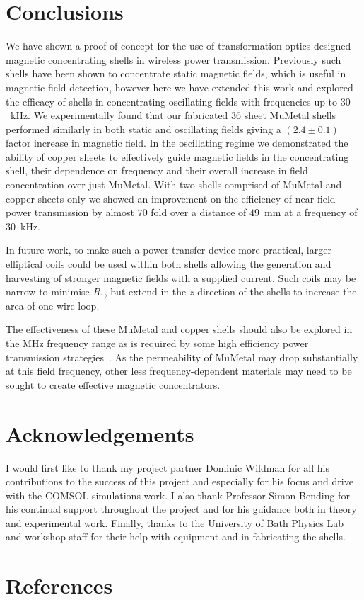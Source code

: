 \documentclass[11pt]{iopart}
\begin{document}
\section{Conclusions}

We have shown a proof of concept for the use of transformation-optics
designed magnetic concentrating shells in wireless power
transmission. Previously such shells have been shown to concentrate
static magnetic fields, which is useful in magnetic field detection, however here
we have extended this work and explored the efficacy of shells in
concentrating oscillating fields with frequencies up to $30$~kHz. We experimentally
found that our fabricated $36$ sheet MuMetal shells performed
similarly in both static and oscillating fields giving a $(2.4\pm0.1)$
factor increase in magnetic field. In the oscillating regime we
demonstrated the ability of copper sheets to effectively guide magnetic
fields in the concentrating shell, their dependence on frequency and their
overall increase in field concentration over just MuMetal. With two
shells comprised of MuMetal and copper sheets only we showed an
improvement on the efficiency of near-field power transmission by
almost $70$ fold over a distance of $49$~mm at a frequency of
$30$~kHz.

In future work, to make such a power transfer device more practical,
larger elliptical coils could be used within both shells allowing the
generation and harvesting of stronger magnetic fields with a supplied
current. Such coils may be narrow to minimise $R_1$, but extend in the
$z$-direction of the shells to increase the area of one wire
loop.

The effectiveness of these MuMetal and copper shells should also be
explored in the MHz frequency range as is required by some high
efficiency power transmission strategies~\cite{Kurs2007}. As the
permeability of MuMetal may drop substantially at this field
frequency, other less frequency-dependent materials may need to be
sought to create effective magnetic concentrators.

\section{Acknowledgements}
I would first like to thank my project partner Dominic Wildman for all
his contributions to the success of this project and especially for
his focus and drive with the COMSOL simulations work.  I also thank
Professor Simon Bending for his continual support throughout the
project and for his guidance both in theory and experimental work.
Finally, thanks to the University of Bath Physics Lab and workshop
staff for their help with equipment and in fabricating the shells.

\section{References}




\end{document}
